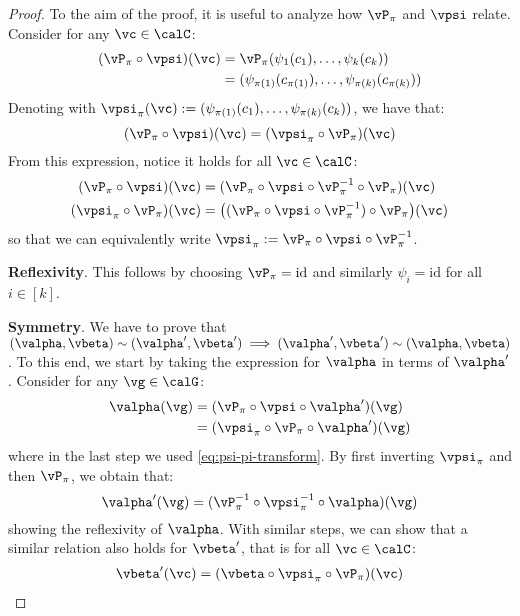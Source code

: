 \begin{proof}

    To the aim of the proof, it is useful to analyze how $\vP_\pi$ and $\vpsi$ relate. Consider for any $\vc \in \calC$:
    \begin{align}
        (\vP_\pi \circ \vpsi)(\vc) 
        &= \vP_\pi ( \psi_1(c_1), \ldots, \psi_k(c_k) ) \\
        &= ( \psi_{\pi(1)}(c_{\pi(1)}), \ldots, \psi_{\pi(k)}(c_{\pi(k)}) )
    \end{align}
    Denoting with $\vpsi_\pi(\vc) := ( \psi_{\pi(1)}(c_1 ), \ldots, \psi_{\pi(k)}(c_k) )$, we have that:
    \[
        (\vP_\pi \circ \vpsi) (\vc) = (\vpsi_\pi \circ \vP_\pi) (\vc) \label{eq:psi-pi-transform}
    \]
    From this expression, notice it holds for all $\vc \in \calC$:
    \begin{align}
        (\vP_\pi \circ \vpsi) (\vc) &= (\vP_\pi \circ \vpsi \circ \vP^{-1}_{\pi} \circ \vP_\pi )(\vc) \\
        (\vpsi_\pi \circ \vP_\pi) (\vc) &= \big( (\vP_\pi \circ \vpsi \circ \vP^{-1}_{\pi}) \circ \vP_\pi \big) (\vc)
    \end{align}
    so that we can equivalently write $\vpsi_\pi:= \vP_\pi \circ \vpsi \circ \vP^{-1}_{\pi}$.
    

    \textbf{Reflexivity}. This follows by choosing $\vP_\pi = \mathrm{id}$ and similarly $\psi_i = \mathrm{id}$ for all $i \in [k]$.

    \textbf{Symmetry}. We have to prove that $(\valpha, \vbeta) \sim (\valpha', \vbeta') \implies (\valpha', \vbeta') \sim (\valpha, \vbeta)$. To this end, we start by taking the expression for $\valpha$ in terms of $\valpha'$. Consider for any $\vg \in \calG$:
    \begin{align}
        \valpha(\vg) &= (\vP_\pi \circ \vpsi \circ \valpha' )(\vg) \\
                     &= (\vpsi_\pi \circ \vP_\pi \circ  \valpha' )(\vg)
    \end{align}
    where in the last step we used \cref{eq:psi-pi-transform}. By first inverting $\vpsi_\pi$ and then $\vP_\pi$, we obtain that:
    \[
        \valpha'(\vg) = (\vP_\pi^{-1} \circ \vpsi_\pi^{-1} \circ \valpha)(\vg)
    \]
    showing the reflexivity of $\valpha$. With similar steps, we can show that a similar relation also holds for $\vbeta'$, that is for all $\vc \in \calC$: 
    \begin{align}
        \vbeta' (\vc)  = (\vbeta \circ \vpsi_\pi \circ \vP_\pi) (\vc)
    \end{align}


\end{proof}
